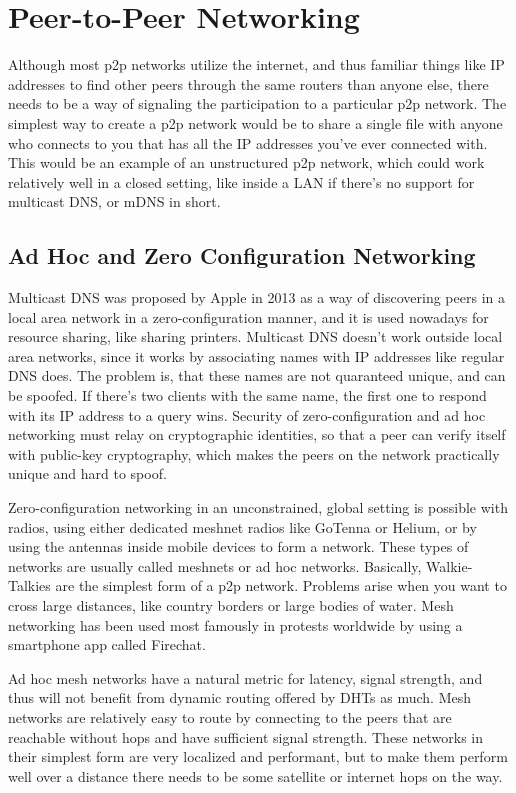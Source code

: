 \chapter{Peer-to-Peer Networking}
\label{Peer-to-Peer Networking}
Although most p2p networks utilize the internet, and thus familiar things like IP addresses to find other peers through the same routers than anyone else, there needs to be a way of signaling the participation to a particular p2p network. The simplest way to create a p2p network would be to share a single file with anyone who connects to you that has all the IP addresses you've ever connected with. This would be an example of an unstructured p2p network, which could work relatively well in a closed setting, like inside a LAN if there's no support for multicast DNS, or mDNS in short.

\section{Ad Hoc and Zero Configuration Networking}
Multicast DNS was proposed by Apple in 2013\cite{Cheshire2013-ja} as a way of discovering peers in a local area network in a zero-configuration manner, and it is used nowadays for resource sharing, like sharing printers. Multicast DNS doesn't work outside local area networks, since it works by associating names with IP addresses like regular DNS does. The problem is, that these names are not quaranteed unique, and can be spoofed. If there's two clients with the same name, the first one to respond with its IP address to a query wins.\cite{Pdp2008-tg} Security of zero-configuration and ad hoc networking must relay on cryptographic identities, so that a peer can verify itself with public-key cryptography, which makes the peers on the network practically unique and hard to spoof.

Zero-configuration networking in an unconstrained, global setting is possible with radios, using either dedicated meshnet radios like GoTenna or Helium, or by using the antennas inside mobile devices to form a network. These types of networks are usually called meshnets or ad hoc networks. Basically, Walkie-Talkies are the simplest form of a p2p network. Problems arise when you want to cross large distances, like country borders or large bodies of water. Mesh networking has been used most famously in protests worldwide by using a smartphone app called Firechat.\cite{Milian2014-mt}

Ad hoc mesh networks have a natural metric for latency, signal strength, and thus will not benefit from dynamic routing offered by DHTs as much. Mesh networks are relatively easy to route by connecting to the peers that are reachable without hops and have sufficient signal strength. These networks in their simplest form are very localized and performant, but to make them perform well over a distance there needs to be some satellite or internet hops on the way. 

